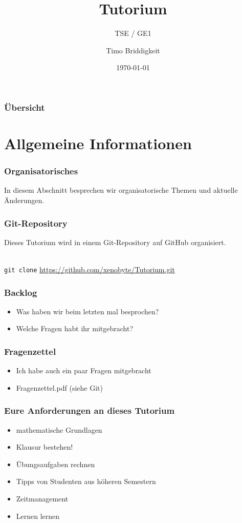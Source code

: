 \documentclass[german,ignorenonframetext]{beamer} %
\institute[MT -- HAW Hamburg]{HAW Hamburg\\ Fakultät TI, Dept.\ Informatik}
\title[Tutorium]{Tutorium}
\subtitle{TSE / GE1}
\author[Timo Briddigkeit]{Timo Briddigkeit}
\date{\today}
\begin{document}
\frame{\titlepage}

\begin{frame}
  \frametitle{Übersicht}
  \tableofcontents
\end{frame}

\section{Allgemeine Informationen} %
\begin{frame}
\frametitle{Organisatorisches}
In diesem Abschnitt besprechen wir organisatorische Themen und aktuelle Änderungen.
\end{frame}

\begin{frame}
\frametitle{Git-Repository}
Dieses Tutorium wird in einem Git-Repository auf GitHub organisiert.
\begin{center}
 \\
\texttt{git clone}
\url{https://github.com/xenobyte/Tutorium.git}
\end{center}
\end{frame}



\begin{frame}
\frametitle{Backlog}
\begin{itemize}
\item Was haben wir beim letzten mal besprochen?
\pause
\item Welche Fragen habt ihr mitgebracht?
\end{itemize}
\end{frame}

\begin{frame}
\frametitle{Fragenzettel}
\begin{itemize}
\item Ich habe auch ein paar Fragen mitgebracht
\pause
\item Fragenzettel.pdf (siehe Git)
\end{itemize}
\end{frame}


\begin{frame}
\frametitle{Eure Anforderungen an dieses Tutorium}
\begin{itemize}
\item mathematische Grundlagen
\pause
\item Klausur bestehen!
\pause
\item Übungsaufgaben rechnen
\pause
\item Tipps von Studenten aus höheren Semestern 
\pause
\item Zeitmanagement
\pause
\item Lernen lernen
\end{itemize}
\end{frame}
\end{document}
